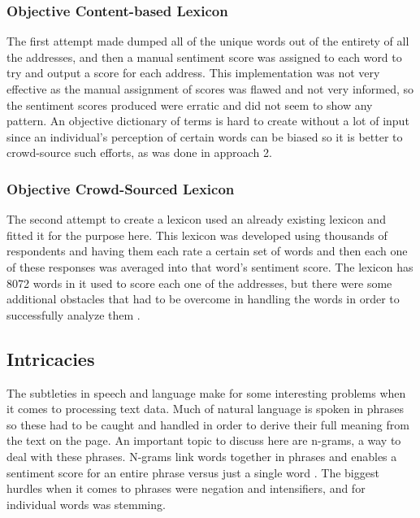 \documentclass[acmtog, review, screen]{acmart}
\begin{document}
\subsubsection{Objective Content-based Lexicon}
The first attempt made dumped all of the unique words out of the entirety of all the addresses, and then a manual sentiment score was assigned to each word to try and output a score for each address.
This implementation was not very effective as the manual assignment of scores was flawed and not very informed, so the sentiment scores produced were erratic and did not seem to show any pattern.
An objective dictionary of terms is hard to create without a lot of input since an individual's perception of certain words can be biased so it is better to crowd-source such efforts, as was done in approach 2.

\subsubsection{Objective Crowd-Sourced Lexicon}
The second attempt to create a lexicon used an already existing lexicon and fitted it for the purpose here.
This lexicon was developed using thousands of respondents and having them each rate a certain set of words and then each one of these responses was averaged into that word's sentiment score.
The lexicon has 8072 words in it used to score each one of the addresses, but there were some additional obstacles that had to be overcome in handling the words in order to successfully analyze them \cite{lexicon}.

\subsection{Intricacies}
The subtleties in speech and language make for some interesting problems when it comes to processing text data.
Much of natural language is spoken in phrases so these had to be caught and handled in order to derive their full meaning from the text on the page.
An important topic to discuss here are n-grams, a way to deal with these phrases.
N-grams link words together in phrases and enables a sentiment score for an entire phrase versus just a single word \cite{nltk}.
The biggest hurdles when it comes to phrases were negation and intensifiers, and for individual words was stemming.
\end{document}
